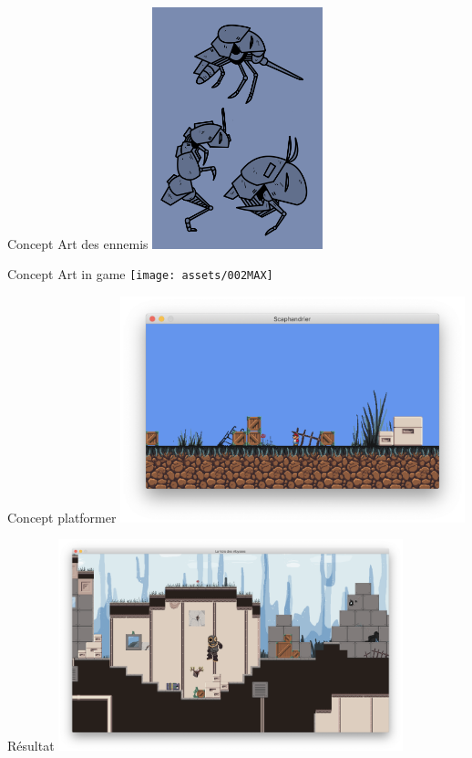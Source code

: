 \documentclass{beamer}
\begin{document}
\begin{frame}{Concept Art des ennemis}
    \centering
    \includegraphics[height=7cm]{assets/02}
\end{frame}

\begin{frame}{Concept Art in game}
    \centering
    \texttt{[image: assets/002MAX]}
\end{frame}

\begin{frame}{Concept platformer}
    \centering
    \includegraphics[width=10cm]{assets/unknown}
\end{frame}

\begin{frame}{Résultat}
    \centering
    \includegraphics[width=10cm]{assets/ingame}
\end{frame}
\end{document}

